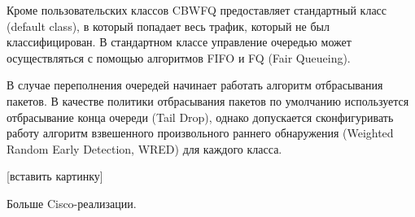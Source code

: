     Кроме пользовательских классов CBWFQ предоставляет стандартный класс (default class),
    в который попадает весь трафик, который не был классифицирован. В стандартном классе
    управление очередью может осуществляться с помощью алгоритмов FIFO и FQ (Fair Queueing). 

    В случае переполнения очередей начинает работать алгоритм отбрасывания пакетов.
    В качестве политики отбрасывания пакетов по умолчанию используется отбрасывание конца
    очереди (Tail Drop), однако допускается сконфигуривать работу
    алгоритм взвешенного произвольного раннего обнаружения (Weighted Random Early Detection, WRED)
    для каждого класса.

    
    [вставить картинку]

    Больше Cisco-реализации.



